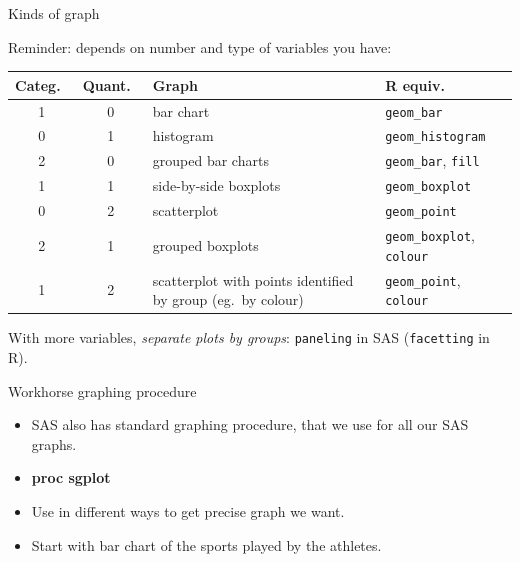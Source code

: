 \documentclass[unknownkeysallowed]{beamer}\usepackage[]{graphicx}\usepackage[]{color}
\begin{document}
\begin{frame}[fragile]{Kinds of graph}
  
  Reminder: depends on number and type of variables you have:
  
  \begin{center}
  \begin{tabular}{ccp{}p{}}
    Categ.\ & Quant.\ & Graph & R equiv.\ \\
    \hline
    1 & 0 & bar chart & \texttt{geom\_bar}\\
    0 & 1 & histogram & \texttt{geom\_histogram}\\
    2 & 0 & grouped bar charts & \texttt{geom\_bar}, \texttt{fill}\\
    1 & 1 & side-by-side boxplots & \texttt{geom\_boxplot}\\
    0 & 2 & scatterplot & \texttt{geom\_point} \\
    2 & 1 & grouped boxplots & \texttt{geom\_boxplot}, \texttt{colour}\\
    1 & 2 & scatterplot with points identified by group (eg.\ by
            colour) & \texttt{geom\_point}, \texttt{colour}\\
    \hline
  \end{tabular}
    
  \end{center}
  
  With more variables, \emph{separate plots by groups}:
  \texttt{paneling} in SAS (\texttt{facetting} in R).
  
\end{frame}

\begin{frame}[fragile]{Workhorse graphing procedure}
  
  \begin{itemize}
  \item   SAS also has standard graphing procedure, that we use for all our
  SAS graphs. 
  \item \textbf{proc sgplot}
  \item   Use in different ways to get precise graph we want.
\item   Start with bar chart of the sports played by the athletes.

  \end{itemize}
    
  
\end{frame}

\end{document}
